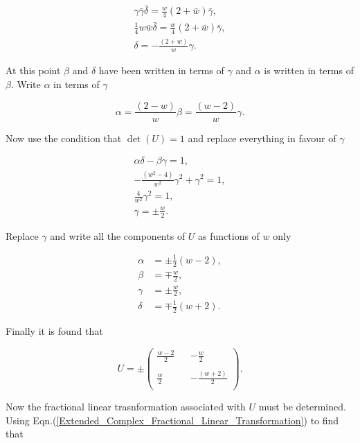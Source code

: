 \begin{appendix}
\begin{gather*}
\gamma \bar{\gamma} \bar{\delta} = \frac{w}{4}(2+\bar{w})\bar{\gamma},\\
\frac{1}{4}w\bar{w} \bar{\delta} = \frac{w}{4}(2+\bar{w})\bar{\gamma},\\
\delta = -\frac{(2 + w)}{w}\gamma.
\end{gather*}

\noindent At this point $\beta$ and $\delta$ have been written in terms of $\gamma$ and $\alpha$ is written in terms of $\beta$. Write $\alpha$ in terms of $\gamma$

\begin{equation*}
\alpha = \frac{(2-w)}{w}\beta = \frac{(w-2)}{w}\gamma.
\end{equation*}

\noindent Now use the condition that $\det{(U)} = 1$ and replace everything in favour of $\gamma$

\begin{gather*}
\alpha \delta - \beta \gamma = 1,\\
-\frac{(w^2 - 4)}{w^2}\gamma^2 + \gamma^2 = 1,\\
\frac{4}{w^2}\gamma^2 = 1,\\
\gamma = \pm \frac{w}{2}.
\end{gather*}

\noindent Replace $\gamma$ and write all the components of $U$ as functions of $w$ only

\begin{align*}
\alpha & = \pm \frac{1}{2}(w-2),\\
\beta & = \mp \frac{w}{2},\\
\gamma & = \pm \frac{w}{2},\\
\delta & = \mp \frac{1}{2}(w+2).
\end{align*}

\noindent Finally it is found that 

\begin{equation*}
U = \pm
\left(
\begin{array}{ccc}
\frac{w-2}{2} & & -\frac{w}{2}     \\
 & & \\
\frac{w}{2}   & & -\frac{(w+2)}{2} \\
\end{array}
\right).
\end{equation*}

Now the fractional linear trasnformation associated with $U$ must be determined. Using Eqn.(\ref{Extended_Complex_Fractional_Linear_Transformation}) to find that


\end{appendix}
